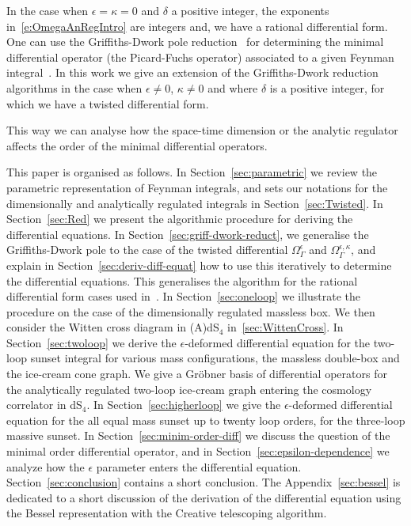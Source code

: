 \documentclass[a4paper,12pt]{article}
\numberwithin{equation}{section}
\numberwithin{figure}{section}
\begin{document}
In the case when $\epsilon=\kappa=0$ and $\delta$ a positive integer, the exponents
in~\eqref{e:OmegaAnRegIntro} are
integers and,
we have a rational differential form. One can use the  Griffiths-Dwork
pole reduction~\cite{Griffiths_1969,Griffith1,Griffith2,Dwork_1962,Dwork_1964} for determining the minimal differential operator (the
Picard-Fuchs operator) associated to a given Feynman
integral~\cite{Bloch:2016izu,Vanhove:2018mto,Lairez:2022zkj}.
In this work we give an extension of the Griffiths-Dwork reduction  algorithms in the case when
$\epsilon\neq0$, $\kappa\neq0$ and where $\delta$ is a positive
integer, for which   we have a twisted differential
form.

 This way we
can analyse how the space-time dimension or the analytic regulator  affects the order of the
minimal differential operators.



This paper is organised as follows. 
In Section~\ref{sec:parametric} we review the parametric
representation of Feynman integrals, and sets our notations for the 
dimensionally and analytically regulated integrals in Section~\ref{sec:Twisted}.
In Section~\ref{sec:Red} we
present the algorithmic procedure for deriving the differential
equations. In Section~\ref{sec:griff-dwork-reduct},  we generalise the
Griffiths-Dwork pole to the case of the twisted differential
$\Omega_\Gamma^\epsilon$ and $\Omega_\Gamma^{\epsilon,\kappa}$, and explain in
Section~\ref{sec:deriv-diff-equat} how to use this iteratively to
determine the differential equations. This generalises the algorithm  for the rational differential form cases
used in~\cite{Lairez:2022zkj}. In Section~\ref{sec:oneloop} we
illustrate the procedure on the case of the dimensionally regulated massless box.
We then consider the Witten cross diagram in (A)dS$_4$ in~\ref{sec:WittenCross}.
In
Section~\ref{sec:twoloop} we derive the $\epsilon$-deformed
differential equation for the two-loop sunset integral for various
mass configurations, the massless double-box and the ice-cream cone
graph. We give a Gr\"obner basis of differential operators for the
analytically regulated
two-loop ice-cream graph entering the cosmology correlator in dS$_4$. In Section~\ref{sec:higherloop} we give the $\epsilon$-deformed
differential
equation for the all equal mass sunset up to twenty loop orders, for
the three-loop massive sunset.
In Section~\ref{sec:minim-order-diff}
we discuss the question of the minimal order differential operator,
and in Section~\ref{sec:epsilon-dependence} we analyze how the
$\epsilon$ parameter enters the differential
equation. Section~\ref{sec:conclusion} contains a short
conclusion. The Appendix~\ref{sec:bessel} is dedicated to a short
discussion of the derivation of the differential equation using the
Bessel representation with the Creative telescoping algorithm.
\end{document}
